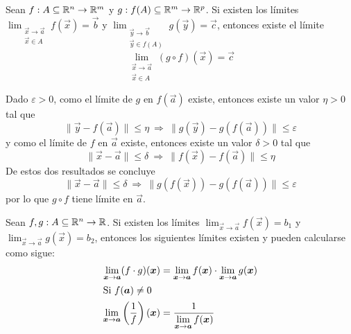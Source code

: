 \begin{teorema}\label{teolimites1-1}
Sean $f:A\subseteq \R^n \to \R^m$ y $g:f(A)\subseteq \R^m \to \R^p$. Si existen los l\'imites $\displaystyle \lim_{\substack{\vec{x}\to \vec{a}\\\vec{x}\in A}} f(\vec{x}) = \vec{b}$ y $\displaystyle \lim_{\substack{\vec{y}\to \vec{b}\\\vec{y}\in f(A)}} g(\vec{y}) = \vec{c}$, entonces existe el l\'imite 
\begin{equation}
\lim_{\substack{\vec{x}\to \vec{a}\\ \vec{x}\in A}} (g\circ f)(\vec{x}) = \vec{c}
\end{equation}
\end{teorema}

\begin{demostracion}
Dado $\varepsilon > 0$, como el l\'imite de $g$ en $f(\vec{a})$ existe, entonces existe un valor $\eta > 0$ tal que 
$$\|\vec{y}-f(\vec{a})\| \leq \eta \:\Rightarrow\: \|g(\vec{y})-g(f(\vec{a}))\| \leq \varepsilon $$
y como el l\'imite de $f$ en $\vec{a}$ existe, entonces existe un valor $\delta > 0$ tal que
$$\|\vec{x}-\vec{a}\|\leq \delta \:\Rightarrow\: \|f(\vec{x})-f(\vec{a})\|\leq \eta$$ 
De estos dos resultados se concluye
$$\|\vec{x}-\vec{a}\| \leq \delta \:\Rightarrow\: \|g(f(\vec{x}))-g(f(\vec{a}))\|\leq \varepsilon$$
por lo que $g\circ f$ tiene l\'imite en $\vec{a}$.
\end{demostracion}

\begin{teorema}\label{teolimites1-2}
Sean $f,g:A\subseteq \R^n \to \R$. Si existen los l\'imites $\displaystyle \lim_{\vec{x}\to \vec{a}} f(\vec{x}) = b_1$ y $\displaystyle \lim_{\vec{x}\to \vec{a}} g(\vec{x}) = b_2$, entonces los siguientes l\'imites existen y pueden calcularse como sigue:
\begin{align}
\lim_{\vec{x} \to \vec{a}} (f\cdot g)(\vec{x}) &= \lim_{\vec{x} \to \vec{a}} f(\vec{x}) \cdot \lim_{\vec{x} \to \vec{a}} g(\vec{x}) \\
\intertext{Si $f(\vec{a})\neq 0$}
\lim_{\vec{x} \to \vec{a}} \left(\frac{1}{f}\right)(\vec{x}) &=  \frac{1}{\displaystyle\lim_{\vec{x} \to \vec{a}} f(\vec{x})}
\end{align}
\end{teorema}

